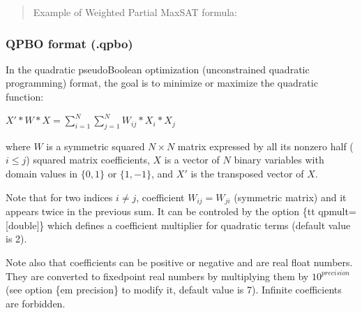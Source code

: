 \documentclass[letterpaper,10pt,openany,oneside,english]{sphinxmanual}
\begin{document}
\begin{quote}
\sphinxAtStartPar
Example of Weighted Partial Max\sphinxhyphen{}SAT formula:

\begin{sphinxVerbatim}[commandchars=\\\{\}]
    
    
    
    
   
   
   
\end{sphinxVerbatim}
\end{quote}

\sphinxstepscope


\subsubsection{QPBO format (.qpbo)}
\label{\detokenize{formats/qpboformat:qpbo-format-qpbo}}\label{\detokenize{formats/qpboformat:qpbo-format}}\label{\detokenize{formats/qpboformat::doc}}
\sphinxAtStartPar
In the quadratic pseudo\sphinxhyphen{}Boolean optimization (unconstrained quadratic programming) format, the goal is to minimize or maximize the quadratic function:

\sphinxAtStartPar
\(X' * W * X = \sum_{i=1}^N \sum_{j=1}^N  W_{ij} * X_i * X_j\)

\sphinxAtStartPar
where \(W\) is a symmetric squared \(N \times N\) matrix expressed by all its non\sphinxhyphen{}zero half (\(i \leq j\)) squared matrix coefficients, \(X\) is a vector of \(N\) binary variables with domain values in \(\{0,1\}\) or \(\{1,-1\}\), and \(X'\) is the transposed vector of \(X\).

\sphinxAtStartPar
Note that for two indices \(i \neq j\), coefficient \(W_{ij} = W_{ji}\) (symmetric matrix) and it appears twice in the previous sum.
It can be controled by the option \{tt \sphinxhyphen{}qpmult={[}double{]}\} which defines a coefficient multiplier for quadratic terms (default value is 2).

\sphinxAtStartPar
Note also that coefficients can be positive or negative and are real float numbers. They are converted to fixed\sphinxhyphen{}point real numbers by multiplying them by \(10^{precision}\) (see option \{em \sphinxhyphen{}precision\} to modify it, default value is 7).  Infinite coefficients are forbidden.
\end{document}
